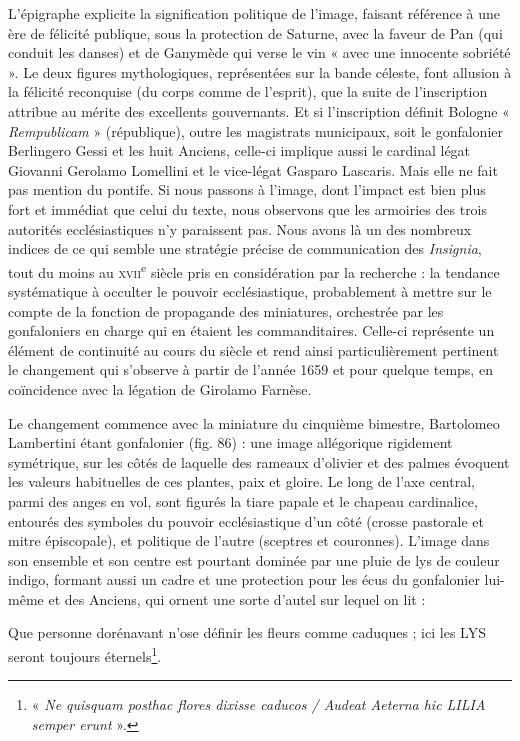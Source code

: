 \documentclass[12pt,twoside,openany]{book}
\renewenvironment{quote}
  {%
    \par\begingroup
    \fontsize{11pt}{14pt}\selectfont
    \list{}{\leftmargin=1.5em\rightmargin=1.5em}%
    \item\relax
  }
  {%
    \endlist
    \endgroup
  }
\newenvironment{PurhBlockQuote}
  {%
    \begin{quote}
  }
  {%
    \end{quote}
  }
\begin{document}
L’épigraphe explicite la signification politique de l’image, faisant référence à une ère de félicité publique, sous la protection de Saturne, avec la faveur de Pan (qui conduit les danses) et de Ganymède qui verse le vin « avec une innocente sobriété ». Le deux figures mythologiques, représentées sur la bande céleste, font allusion à la félicité reconquise (du corps comme de l’esprit), que la suite de l’inscription attribue au mérite des excellents gouvernants. Et si l’inscription définit Bologne « \textit{Rempublicam} » (république), outre les magistrats municipaux, soit le gonfalonier Berlingero Gessi et les huit Anciens, celle-ci implique aussi le cardinal légat Giovanni Gerolamo Lomellini et le vice-légat Gasparo Lascaris. Mais elle ne fait pas mention du pontife. Si nous passons à l’image, dont l’impact est bien plus fort et immédiat que celui du texte, nous observons que les armoiries des trois autorités ecclésiastiques n’y paraissent pas. Nous avons là un des nombreux indices de ce qui semble une stratégie précise de communication des \textit{Insignia}, tout du moins au \textsc{xvii}\textsuperscript{e }siècle pris en considération par la recherche : la tendance systématique à occulter le pouvoir ecclésiastique, probablement à mettre sur le compte de la fonction de propagande des miniatures, orchestrée par les gonfaloniers en charge qui en étaient les commanditaires. Celle-ci représente un élément de continuité au cours du siècle et rend ainsi particulièrement pertinent le changement qui s’observe à partir de l’année 1659 et pour quelque temps, en coïncidence avec la légation de Girolamo Farnèse.

Le changement commence avec la miniature du cinquième bimestre, Bartolomeo Lambertini étant gonfalonier (fig. 86) : une image allégorique rigidement symétrique, sur les côtés de laquelle des rameaux d’olivier et des palmes évoquent les valeurs habituelles de ces plantes, paix et gloire. Le long de l’axe central, parmi des anges en vol, sont figurés la tiare papale et le chapeau cardinalice, entourés des symboles du pouvoir ecclésiastique d’un côté (crosse pastorale et mitre épiscopale), et politique de l’autre (sceptres et couronnes). L’image dans son ensemble et son centre est pourtant dominée par une pluie de lys de couleur indigo, formant aussi un cadre et une protection pour les écus du gonfalonier lui-même et des Anciens, qui ornent une sorte d’autel sur lequel on lit :

\begin{PurhBlockQuote}
Que personne dorénavant n’ose définir les fleurs comme caduques ; ici les LYS seront toujours éternels\footnote{« \textit{Ne quisquam posthac flores dixisse caducos / Audeat Aeterna hic LILIA semper erunt} ».}.
\end{PurhBlockQuote}
\end{document}
